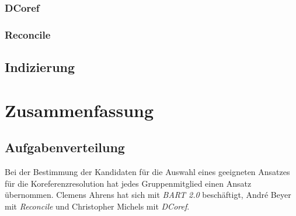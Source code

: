 \documentclass[a4paper,12pt,titlepage=true, ngerman]{scrartcl}
\begin{document}

\subsubsection{DCoref}%





\subsubsection{Reconcile}%


\subsection{Indizierung}\label{Indizierung}%



%








\newpage

\section{Zusammenfassung}%



\subsection{Aufgabenverteilung}%

Bei der Bestimmung der Kandidaten für die Auswahl eines geeigneten Ansatzes für die Koreferenzresolution hat jedes Gruppenmitglied einen Ansatz übernommen. Clemens Ahrens hat sich mit \emph{BART 2.0} beschäftigt, André Beyer mit \emph{Reconcile} und Christopher Michels mit \emph{DCoref}.
\end{document}
